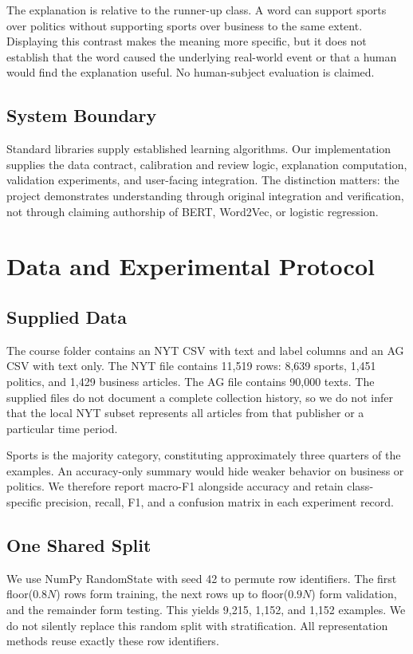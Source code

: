\documentclass[11pt]{article}
\begin{document}
The explanation is relative to the runner-up class. A word can support sports over politics without supporting sports over business to the same extent. Displaying this contrast makes the meaning more specific, but it does not establish that the word caused the underlying real-world event or that a human would find the explanation useful. No human-subject evaluation is claimed.

\subsection{System Boundary}
Standard libraries supply established learning algorithms. Our implementation supplies the data contract, calibration and review logic, explanation computation, validation experiments, and user-facing integration. The distinction matters: the project demonstrates understanding through original integration and verification, not through claiming authorship of BERT, Word2Vec, or logistic regression.
\clearpage
\section{Data and Experimental Protocol}
\subsection{Supplied Data}
The course folder contains an NYT CSV with text and label columns and an AG CSV with text only. The NYT file contains 11,519 rows: 8,639 sports, 1,451 politics, and 1,429 business articles. The AG file contains 90,000 texts. The supplied files do not document a complete collection history, so we do not infer that the local NYT subset represents all articles from that publisher or a particular time period.

Sports is the majority category, constituting approximately three quarters of the examples. An accuracy-only summary would hide weaker behavior on business or politics. We therefore report macro-F1 alongside accuracy and retain class-specific precision, recall, F1, and a confusion matrix in each experiment record.

\subsection{One Shared Split}
We use NumPy RandomState with seed 42 to permute row identifiers. The first floor($0.8N$) rows form training, the next rows up to floor($0.9N$) form validation, and the remainder form testing. This yields 9,215, 1,152, and 1,152 examples. We do not silently replace this random split with stratification. All representation methods reuse exactly these row identifiers.
\end{document}

